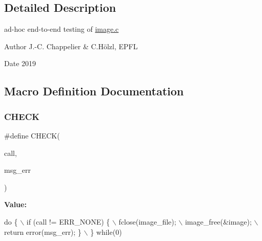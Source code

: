 \subsection{Detailed Description}
ad-\/hoc end-\/to-\/end testing of \hyperlink{image_8c}{image.\+c} 

\begin{DoxyAuthor}{Author}
J.-\/C. Chappelier \& C.\+Hölzl, E\+P\+FL 
\end{DoxyAuthor}
\begin{DoxyDate}{Date}
2019 
\end{DoxyDate}


\subsection{Macro Definition Documentation}
\mbox{\label{test-image_8c_a385848a86a03e7791a73468b1d8720e1}} 
\subsubsection{\texorpdfstring{C\+H\+E\+CK}{CHECK}}
{\footnotesize\ttfamily \#define C\+H\+E\+CK(\begin{DoxyParamCaption}\item[{}]{call,  }\item[{}]{msg\+\_\+err }\end{DoxyParamCaption})}

{\bfseries Value\+:}
\begin{DoxyCode}
\textcolor{keywordflow}{do} \{ \(\backslash\)
        if (call != ERR\_NONE) \{ \(\backslash\)
            fclose(image\_file); \(\backslash\)
            image\_free(&image); \(\backslash\)
            return error(msg\_err); \} \(\backslash\)
    \} \textcolor{keywordflow}{while}(0)
\end{DoxyCode}
